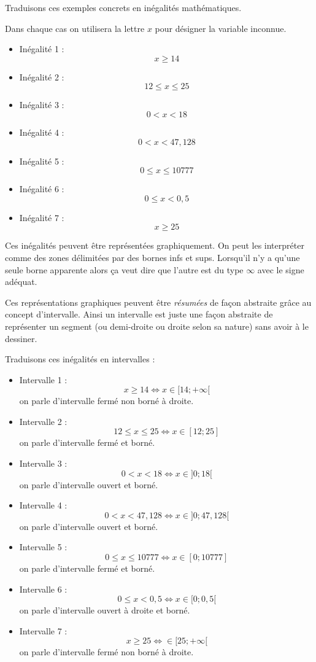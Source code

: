 \documentclass[a4paper,11pt]{book}
\begin{document}
Traduisons ces exemples concrets en inégalités mathématiques.

Dans chaque cas on utilisera la lettre \(x\) pour désigner la variable
inconnue.

\begin{itemize}
\item Inégalité 1 : \[x \geq 14\]
\item Inégalité 2 : \[12 \leq x \leq 25\]
\item Inégalité 3 : \[0 < x < 18\]
\item Inégalité 4 : \[0 < x < 47,128\]
\item Inégalité 5 : \[0 \leq x \leq 10 777\]
\item Inégalité 6 : \[0 \leq x < 0,5\]
\item Inégalité 7 : \[x \geq 25\]
\end{itemize}


Ces inégalités peuvent être représentées graphiquement. On peut les
interpréter comme des zones délimitées par des bornes
\glspl{inf} et \glspl{sup}. Lorsqu'il n'y a qu'une seule
borne apparente alors ça veut dire que l'autre est du
type \(\infty\) avec le signe adéquat.


Ces représentations graphiques peuvent être \emph{résumées} de façon
abstraite grâce au concept d'intervalle. Ainsi un \gls{intervalle} est
juste une façon abstraite de représenter un segment (ou demi-droite ou
droite selon sa nature) sans avoir à le dessiner.

Traduisons ces inégalités en intervalles :


\begin{itemize}
\item Intervalle 1 : \[x \geq 14 \iff x\in [14 ; +\infty[\] on parle
d'intervalle fermé non borné à droite.
\item Intervalle 2 : \[12 \leq x \leq 25\iff x\in [12 ; 25]\] on parle
d'intervalle fermé et borné.
\item Intervalle 3 : \[0 < x < 18\iff x\in ]0 ; 18[\] on parle
d'intervalle ouvert et borné.
\item Intervalle 4 : \[0 < x < 47,128\iff x\in ]0 ; 47,128[\] on parle
d'intervalle ouvert et borné.
\item Intervalle 5 : \[0\leq x \leq 10 777\iff x\in [0 ; 10777]\] on parle
d'intervalle fermé et borné.
\item Intervalle 6 : \[0 \leq x < 0,5\iff x\in [0 ; 0,5[\] on parle
d'intervalle ouvert à droite et borné.
\item Intervalle 7 : \[x \geq 25\iff \in [25 ; +\infty[\] on parle
d'intervalle fermé non borné à droite.
\end{itemize}
\end{document}
